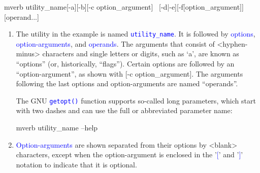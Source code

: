 \documentclass[12pt]{report}
\newcommand{\struct}[1]{\textcolor{blue}{#1}}
\newcommand{\cmd}[1]{\textcolor{blue}{\tt #1}}
\begin{document}
\begin{code}{mverb}
utility_name[-a][-b][-c option_argument] \
                          [-d|-e][-f[option_argument]][operand...]
\end{code}

\noindent
\begin{enumerate}
\item The utility in the example is named \struct{\cmd{utility\_name}}.
It is followed by \struct{options}, \struct{option-arguments}, and \struct{operands}.
The arguments that consist of <hyphen-minus> characters and single letters or
digits, such as `a', are known as ``options'' (or, historically, ``flags'').
Certain options are followed by an ``option-argument'', as shown with
[-c option\_argument]. The arguments following the last options and
option-arguments are named ``operands''.

The GNU \cmd{getopt()} function supports so-called long parameters, which start
with two dashes and can use the full or abbreviated parameter name:
\begin{code}{mverb}
utility_name --help
\end{code}
\item \struct{Option-arguments} are shown separated from their options by
<blank> characters, except when the option-argument is enclosed in the
'\struct{[}' and '\struct{]}' notation to indicate that it is optional.


\end{enumerate}
\end{document}
